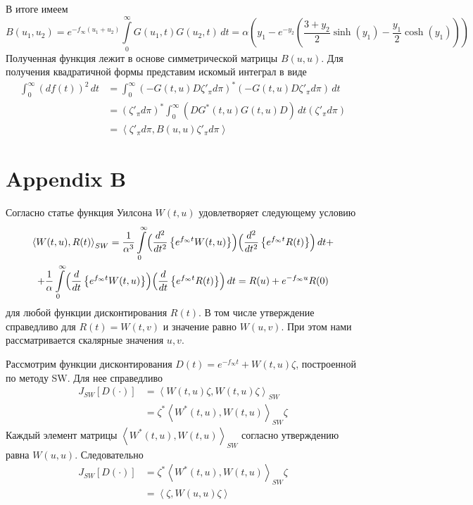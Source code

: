 \documentclass[10pt]{article}
\theoremstyle{definition}
\theoremstyle{remark}
\theoremstyle{plain}
\newcommand{\w}{f_\infty}
\newcommand{\scalar}[2]{\left<#1,#2\right>}
\begin{document}
В итоге имеем 
$$
B(u_1,u_2) = e^{-\w(u_1+u_2)}\int\limits_0^{\infty}G(u_1,t)G(u_2,t)\,dt = 
\alpha \left(y_1 - e^{-y_2}\left(\frac{3+y_2}{2}\sinh(y_1) - \frac{y_1}{2}\cosh(y_1)\right) \right)
$$
Полученная функция лежит в основе симметрической матрицы $B(u,u)$. Для получения квадратичной формы представим искомый интеграл в виде
\begin{align*}
\int_0^{\infty} (df(t))^2\,dt &= 
\int_0^{\infty} (-G(t,u)D\zeta'_{\pi}d\pi)^*(-G(t,u)D\zeta'_{\pi}d\pi)\,dt 
\\
&= (\zeta'_{\pi}d\pi)^* \int_0^{\infty} (DG^*(t,u)G(t,u)D)\,dt (\zeta'_{\pi}d\pi)
\\
&= \scalar{\zeta'_{\pi}d\pi}{ B(u,u) \zeta'_{\pi}d\pi}
\end{align*}

\section*{Appendix B}
Согласно статье \cite{Smith_Wilson} функция Уилсона $W(t,u)$ удовлетворяет следующему условию 
\begin{multline*}
\scalar{W(t,u)}{R(t)}_{SW} = 
		\frac{1}{\alpha^3}
		\int\limits_0^\infty 
		\Bigl(
			\frac{d^2}{dt^2}
			\left\{
				e^{\w t} W(t,u)
			\right\}
		\Bigr)
		\Bigl(
			\frac{d^2}{dt^2}
			\left\{
				e^{\w t} R(t)
			\right\}
		\Bigr)
		\, dt
		+
		\\
		+
		\frac{1}{\alpha}
		\int\limits_0^\infty 
		\Bigl(
			\frac{d}{dt}
			\left\{
				e^{\w t} W(t,u)
			\right\}
		\Bigr)
		\Bigl(
			\frac{d}{dt}
			\left\{
				e^{\w t} R(t)
			\right\}
		\Bigr)
		\, dt
		=
		R(u)+e^{-\w u }R(0)
\end{multline*}
для любой функции дисконтирования $R(t)$. В том числе утверждение справедливо для $R(t) = W(t,v)$ и значение равно $W(u,v)$. При этом нами рассматривается скалярные значения $u,v$.

Рассмотрим функции дисконтирования $D(t) = e^{-\w t}+ W(t,u)\zeta$, построенной по методу SW. Для нее справедливо 
\begin{align*}
J_{SW}[D(\cdot)] &= \scalar{W(t,u)\zeta}{W(t,u)\zeta}_{SW} 
\\
&= \zeta^*\scalar{W^*(t,u)}{W(t,u)}_{SW}\zeta
\end{align*}
Каждый элемент матрицы $\scalar{W^*(t,u)}{W(t,u)}_{SW}$ согласно утверждению равна $W(u,u)$. Следовательно
\begin{align*}
J_{SW}[D(\cdot)] &= \zeta^*\scalar{W^*(t,u)}{W(t,u)}_{SW}\zeta
\\
&= \scalar{\zeta}{W(u,u)\zeta}
\end{align*}
\newpage
{}

\end{document}
